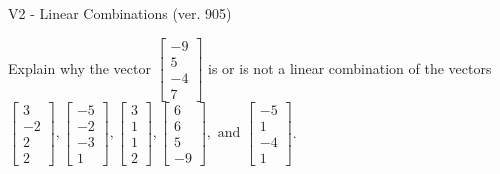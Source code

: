 \begin{exercise}
  \begin{exerciseTitle}V2 - Linear Combinations (ver. 905)\end{exerciseTitle}
  \begin{exerciseStatement}
    Explain why the vector \(\left[\begin{array}{c}
-9 \\
5 \\
-4 \\
7
\end{array}\right]\)  is or is not a linear 
	combination of the vectors \(\left[\begin{array}{c}
3 \\
-2 \\
2 \\
2
\end{array}\right] , \left[\begin{array}{c}
-5 \\
-2 \\
-3 \\
1
\end{array}\right] , \left[\begin{array}{c}
3 \\
1 \\
1 \\
2
\end{array}\right] , \left[\begin{array}{c}
6 \\
6 \\
5 \\
-9
\end{array}\right] , \text{ and } \left[\begin{array}{c}
-5 \\
1 \\
-4 \\
1
\end{array}\right]\).
	



\end{exerciseStatement}
\end{exercise}
